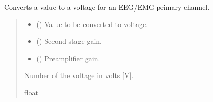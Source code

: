 \documentclass[letterpaper,10pt,english]{sphinxmanual}
\begin{document}
\begin{fulllineitems}
\begin{fulllineitems}
\label{\detokenize{PodDevice_8401HR:PodDevice_8401HR.POD_8401HR._Voltage_PrimaryChannels_EEGEMG}}
\pysigstartsignatures
{}
\pysigstopsignatures
\sphinxAtStartPar
Converts a value to a voltage for an EEG/EMG primary channel.
\begin{quote}\begin{description}
\begin{itemize}
\item {} 
\sphinxAtStartPar
{} () \textendash{} Value to be converted to voltage.

\item {} 
\sphinxAtStartPar
{} () \textendash{} Second stage gain.

\item {} 
\sphinxAtStartPar
{} () \textendash{} Preamplifier gain.

\end{itemize}

\sphinxAtStartPar
Number of the voltage in volts {[}V{]}.

\sphinxAtStartPar
float

\end{description}\end{quote}

\end{fulllineitems}



\end{fulllineitems}
\end{document}
